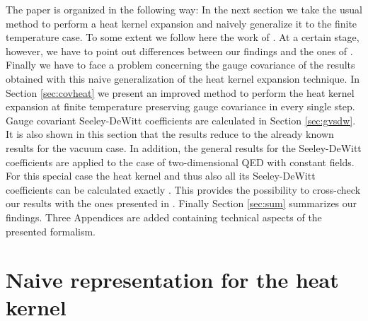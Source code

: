 \documentclass[a4paper,showpacs,showkeys,prd,nofootinbib]{revtex4}
\begin{document}
The paper is organized in the following way: In the next section we take
the usual method to perform a heat kernel expansion and naively 
generalize it to the finite
temperature case. To some extent we follow here the work of \cite{Boschi-Filho:1992ah}. At a certain
stage, however, we have to point out differences between our findings and the ones of
\cite{Boschi-Filho:1992ah}. Finally we have to face a problem concerning the gauge covariance of the
results obtained with this naive generalization of the heat kernel expansion technique.
In Section \ref{sec:covheat} we present an improved method to perform the heat kernel
expansion at finite temperature preserving gauge covariance in every single step. 
Gauge covariant Seeley-DeWitt coefficients are calculated in Section \ref{sec:gvsdw}.
It is also shown in this section that the results reduce to the already known results
for the vacuum case. In addition, the general results for the Seeley-DeWitt 
coefficients are applied to the case of two-dimensional QED with constant fields.
For this special case the heat kernel and thus also all its Seeley-DeWitt coefficients
can be calculated exactly \cite{Actor:1998cn}. This provides the possibility to cross-check
our results with the ones presented in \cite{Actor:1998cn}. Finally Section \ref{sec:sum}
summarizes our findings. Three Appendices are added containing technical aspects
of the presented formalism.




\section{Naive representation for the heat kernel}
\label{sec:naiv}
\end{document}
